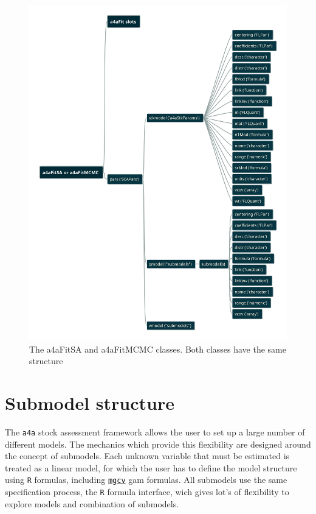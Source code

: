 \documentclass[
]{book}
\begin{document}
\begin{figure}
\centering
\includegraphics{fitsamcclass.png}
\caption{The a4aFitSA and a4aFitMCMC classes. Both classes have the same structure}
\end{figure}

\hypertarget{submodel-structure}{%
\chapter{\texorpdfstring{Submodel structure \label{sec:submod}}{Submodel structure }}\label{submodel-structure}}

The \texttt{a4a} stock assessment framework allows the user to set up a large number of different models. The mechanics which provide this flexibility are designed around the concept of submodels. Each unknown variable that must be estimated is treated as a linear model, for which the user has to define the model structure using \texttt{R} formulas, including \href{http://cran.r-project.org/web/packages/mgcv/index.html}{\texttt{mgcv}} gam formulas. All submodels use the same specification process, the \texttt{R} formula interface, wich gives lot's of flexibility to explore models and combination of submodels.
\end{document}
